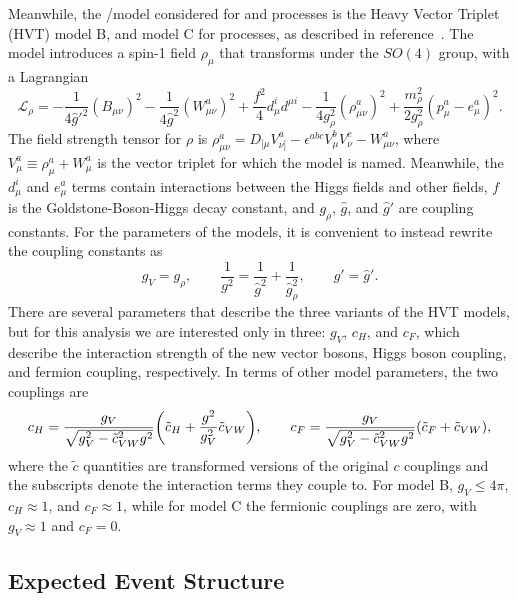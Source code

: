 Meanwhile, the \Wpr/\Zpr model considered for \ggF and \DY processes is the Heavy Vector Triplet (HVT) model B, and model C for \VBF processes, as described in reference~\cite{Pappadopulo_2014}.
The model introduces a spin-1 field $\rho_\mu$ that transforms under the $SO(4)$ group, with a Lagrangian
\begin{equation}
  \mathcal{L}_\rho=-\frac{1}{4\hat{g}'^2}(B_{\mu\nu})^2-\frac{1}{4\hat{g}^2}(W_{\mu\nu}^a)^2+\frac{f^2}{4}d_\mu^id^{\mu i}-\frac{1}{4g_\rho^2}(\rho_{\mu\nu}^a)^2+\frac{m_\rho^2}{2g_\rho^2}(p_\mu^a-e_\mu^a)^2.
\end{equation}
The field strength tensor for $\rho$ is $\rho_{\mu\nu}^a=D_{[\mu}V_{\nu]}^a-\epsilon^{abc}V_\mu^bV_\nu^c-W_{\mu\nu}^a$, where $V_\mu^a\equiv\rho_\mu^a+W_\mu^a$ is the vector triplet for which the model is named.
Meanwhile, the $d_\mu^i$ and $e_\mu^a$ terms contain interactions between the Higgs fields and other fields, $f$ is the Goldstone-Boson-Higgs decay constant, and $g_\rho$, $\hat{g}$, and $\hat{g}'$ are coupling constants.
For the parameters of the models, it is convenient to instead rewrite the coupling constants as
\begin{equation}
  g_V=g_\rho,\qquad \frac{1}{g^2}=\frac{1}{\hat{g}^2}+\frac{1}{\hat{g}_\rho^2},\qquad g'=\hat{g}'.
\end{equation}
There are several parameters that describe the three variants of the HVT models, but for this analysis we are interested only in three: $g_V$, $c_H$, and $c_F$, which describe the interaction strength of the new vector bosons, Higgs boson coupling, and fermion coupling, respectively.
In terms of other model parameters, the two couplings are
\begin{equation}
  c_H=\frac{g_V}{\sqrt{g_V^2-\tilde{c}_{VW}^2g^2}}\pqty{\tilde{c}_H+\frac{g^2}{g_V^2}\tilde{c}_{VW}},\qquad c_F=\frac{g_V}{\sqrt{g_V^2-\tilde{c}_{VW}^2g^2}}(\tilde{c}_F+\tilde{c}_{VW}),
\end{equation}
where the $\tilde{c}$ quantities are transformed versions of the original $c$ couplings and the subscripts denote the interaction terms they couple to.
For model B, $g_V\leq4\pi$, $c_H\approx1$, and $c_F\approx1$, while for model C the fermionic couplings are zero, with $g_V\approx1$ and $c_F=0$.

\subsection{Expected Event Structure}
\label{subsec:expEvent}

